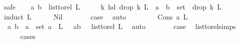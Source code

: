 \begin{isabellebody}
%
\isadelimproof
%
\endisadelimproof
%
\isatagproof
{}\isamarkupfalse%
{\isacharparenleft}{\kern0pt}safe{\isacharparenright}{\kern0pt}\isanewline
\ \ \isamarkupfalse%
\ {\isachardoublequoteopen}{\isacharparenleft}{\kern0pt}a{\isacharcomma}{\kern0pt}\ b{\isacharparenright}{\kern0pt}\ {\isasymin}\ list{\isacharunderscore}{\kern0pt}to{\isacharunderscore}{\kern0pt}rel\ L{\isachardoublequoteclose}\isanewline
\ \ \isamarkupfalse%
\ \isamarkupfalse%
\ {\isachardoublequoteopen}{\isasymexists}k{\isachardot}{\kern0pt}\ hd\ {\isacharparenleft}{\kern0pt}drop\ k\ L{\isacharparenright}{\kern0pt}\ {\isacharequal}{\kern0pt}\ a\ {\isasymand}\ b\ {\isasymin}\ set\ \ {\isacharparenleft}{\kern0pt}drop\ k\ L{\isacharparenright}{\kern0pt}{\isachardoublequoteclose}\isanewline
\ \ \isamarkupfalse%
{\isacharparenleft}{\kern0pt}induct\ L{\isacharparenright}{\kern0pt}\isanewline
\ \ \ \ \isamarkupfalse%
\ Nil\isanewline
\ \ \ \ \isamarkupfalse%
\ \isamarkupfalse%
\ {\isacharquery}{\kern0pt}case\ \isamarkupfalse%
\ auto\isanewline
\ \ \isamarkupfalse%
\isanewline
\ \ \ \ \isamarkupfalse%
\ {\isacharparenleft}{\kern0pt}Cons\ a{}\ L{\isacharparenright}{\kern0pt}\isanewline
\ \ \ \ \isamarkupfalse%
\ \isamarkupfalse%
\ {\isachardoublequoteopen}{\isacharparenleft}{\kern0pt}a{\isacharcomma}{\kern0pt}\ b{\isacharparenright}{\kern0pt}\ {\isasymin}\ {\isacharbraceleft}{\kern0pt}a{}{\isacharbraceright}{\kern0pt}\ {\isasymtimes}\ set\ {\isacharparenleft}{\kern0pt}a{}\ {\isacharhash}{\kern0pt}\ L{\isacharparenright}{\kern0pt}\ {\isachardoublequoteclose}\ {\isacharbar}{\kern0pt}\ {\isachardoublequoteopen}{\isacharparenleft}{\kern0pt}a{\isacharcomma}{\kern0pt}b{\isacharparenright}{\kern0pt}\ {\isasymin}\ \ list{\isacharunderscore}{\kern0pt}to{\isacharunderscore}{\kern0pt}rel\ L{\isachardoublequoteclose}\ \isamarkupfalse%
\ auto\isanewline
\ \ \ \ \isamarkupfalse%
\ \isamarkupfalse%
\ {\isacharquery}{\kern0pt}case\ \isamarkupfalse%
\ list{\isacharunderscore}{\kern0pt}to{\isacharunderscore}{\kern0pt}rel{\isachardot}{\kern0pt}simps{\isacharparenleft}{\kern0pt}{}{\isacharparenright}{\kern0pt}\ \ \isanewline
\ \ \ \ \isamarkupfalse%
{\isacharparenleft}{\kern0pt}cases{\isacharparenright}{\kern0pt}\isanewline
\ \ \ \ \ \ \isamarkupfalse%

\end{isabellebody}
